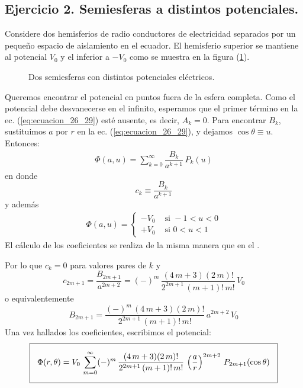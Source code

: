 \subsection{Ejercicio 2. Semiesferas a distintos potenciales.}
Considere dos hemisferios de radio conductores de electricidad separados por un pequeño espacio de aislamiento en el ecuador. El hemisferio superior se mantiene al potencial $V_{0}$ y el inferior a $-V_{0}$ como se muestra en la figura (\ref{fig:figura_esfera_02}).
\begin{figure}[H]
    \centering
    
    \caption{Dos semiesferas con distintos potenciales eléctricos.}
    \label{fig:figura_esfera_02}
\end{figure}
Queremos encontrar el potencial en puntos fuera de la esfera completa. Como el potencial debe desvanecerse en el infinito, esperamos que el primer término en la ec. (\ref{eq:ecuacion_26_29}) esté ausente, es decir, $A_{k} = 0$. Para encontrar $B_{k}$, sustituimos $a$ por $r$ en la ec. (\ref{eq:ecuacion_26_29}), y dejamos $\cos \theta \equiv u$. Entonces:
\begin{align*}
\Phi (a, u) = \sum_{k=0}^{\infty} \dfrac{B_{k}}{a^{k+1}} \, P_{k} (u)
\end{align*}
en donde
\[ c_{k} \equiv \dfrac{B_{k}}{a^{k+1}} \]
y además
\begin{align*}
\Phi (a, u) = \begin{cases}
-V_{0} & \mbox{ si } -1 < u < 0 \\
+V_{0} & \mbox{ si } 0 < u < 1
\end{cases}
\end{align*}
El cálculo de los coeficientes se realiza de la misma manera que en el .
\par
Por lo que $c_{k} = 0$ para valores pares de $k$ y
\[ c_{2m+1} = \dfrac{B_{2m+1}}{a^{2m+2}} = (-)^{m} \, \dfrac{(4 \, m + 3)(2 \, m)!}{2^{2m+1} \, (m + 1)! \, m!} \, V_{0} \]
o equivalentemente
\[ B_{2m+1} = \dfrac{(-)^{m} \, (4 \, m + 3)(2 \, m)!}{2^{2m+1} \, (m + 1)! \, m!} \, a^{2m+2} \, V_{0} \]
Una vez hallados los coeficientes, escribimos el potencial:
\begin{equation}
\setlength{\fboxsep}{3\fboxsep}\boxed{\Phi (r, \theta) = V_{0} \, \sum_{m=0}^{\infty} (-)^{m} \, \dfrac{(4 \, m + 3)(2 \, m)!}{2^{2m+1} \, (m + 1)! \, m!} \, \left( \dfrac{a}{r} \right)^{2m+2} \, P_{2m+1} (\cos \theta)}
\label{eq:ecuacion_26_53}
\end{equation}

